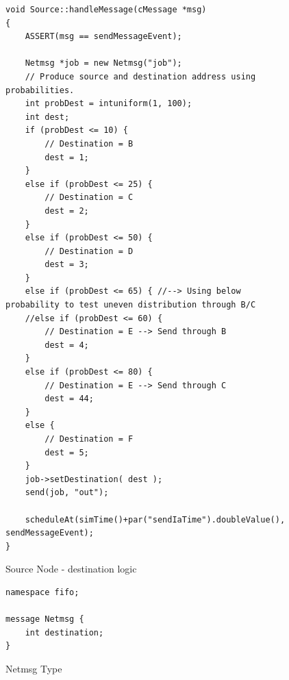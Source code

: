 \documentclass{article}
\begin{document}
\begin{appendices}
\begin{figure}[h!]
\begin{lstlisting}
void Source::handleMessage(cMessage *msg)
{
    ASSERT(msg == sendMessageEvent);

    Netmsg *job = new Netmsg("job");
    // Produce source and destination address using probabilities.
    int probDest = intuniform(1, 100);
    int dest;
    if (probDest <= 10) {
        // Destination = B
        dest = 1;
    }
    else if (probDest <= 25) {
        // Destination = C
        dest = 2;
    }
    else if (probDest <= 50) {
        // Destination = D
        dest = 3;
    }
    else if (probDest <= 65) { //--> Using below probability to test uneven distribution through B/C
    //else if (probDest <= 60) {
        // Destination = E --> Send through B
        dest = 4;
    }
    else if (probDest <= 80) {
        // Destination = E --> Send through C
        dest = 44;
    }
    else {
        // Destination = F
        dest = 5;
    }
    job->setDestination( dest );
    send(job, "out");

    scheduleAt(simTime()+par("sendIaTime").doubleValue(), sendMessageEvent);
}
\end{lstlisting}
\vspace{-1cm}
\caption*{Source Node - destination logic}
\end{figure}

\begin{figure}[h!]
\begin{lstlisting}
namespace fifo;

message Netmsg {
    int destination;
}
\end{lstlisting}
\vspace{-1cm}
\caption*{Netmsg Type}
\end{figure}

\end{appendices}
\end{document}
